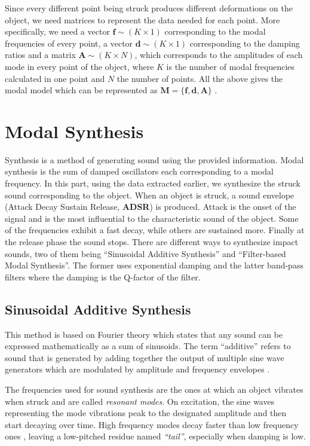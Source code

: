 Since every different point being struck produces different deformations on the object, we need matrices to represent the data needed for each point. More specifically, we need a vector $\textbf{f}\sim (K \times 1)$  corresponding to the modal frequencies of every point, a vector $\textbf{d}\sim (K \times 1)$ corresponding to the damping ratios and a matrix $\textbf{A}\sim (K \times N)$, which corresponds to the amplitudes of each mode in every point of the object, where $K$ is the number of modal frequencies calculated in one point and $N$ the number of points. All the above gives the modal model which can be represented as $\textbf{M} = \{\textbf{f}, \textbf{d}, \textbf{A}\}$ \cite{van2001foleyautomatic}.
 
\section{Modal Synthesis}\label{sec:modal_synth}
Synthesis is a method of generating sound using the provided information. Modal synthesis is the sum of damped oscillators each corresponding to a modal frequency. In this part, using the data extracted earlier, we synthesize the struck sound corresponding to the object. When an object is struck, a sound envelope (Attack Decay Sustain Release, \textbf{ADSR}) is produced. Attack is the onset of the signal and is the most influential to the characteristic sound of the object. Some of the frequencies exhibit a fast decay, while others are sustained more.  Finally at the release phase the sound stops. There are different ways to synthesize impact sounds, two of them being ``Sinusoidal Additive Synthesis'' and ``Filter-based Modal Synthesis''. The former uses exponential damping and the latter band-pass filters where the damping is the Q-factor of the filter. 

\subsection{Sinusoidal Additive Synthesis}\label{sec:sin_synth}

This method is based on Fourier theory which states that any sound can be expressed mathematically as a sum of sinusoids. The term ``additive'' refers to sound that is generated by adding together the output of multiple sine wave generators which are modulated by amplitude and frequency envelopes \cite{smith2011spectral}.

The frequencies used for sound synthesis are the ones at which an object vibrates when struck and are called \textit{resonant modes}. On excitation, the sine waves representing the mode vibrations peak to the designated amplitude and then start decaying over time. High frequency modes decay faster than low frequency ones \cite{lloyd2011sound}, leaving a low-pitched residue named \textit{``tail''}, especially when damping is low.

